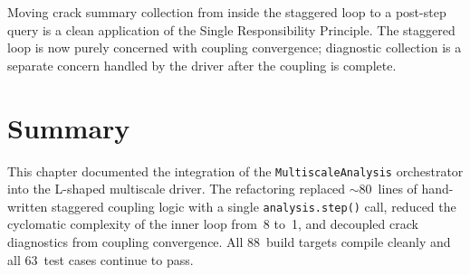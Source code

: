 Moving crack summary collection from inside the staggered loop to a
post-step query is a clean application of the Single Responsibility
Principle.  The staggered loop is now purely concerned with coupling
convergence; diagnostic collection is a separate concern handled by
the driver after the coupling is complete.


\section{Summary}
\label{sec:driver-summary}

This chapter documented the integration of the
\texttt{MultiscaleAnalysis} orchestrator into the L-shaped multiscale
driver.  The refactoring replaced $\sim$80~lines of hand-written
staggered coupling logic with a single \verb|analysis.step()| call,
reduced the cyclomatic complexity of the inner loop from~8 to~1, and
decoupled crack diagnostics from coupling convergence.  All 88~build
targets compile cleanly and all 63~test cases continue to pass.
